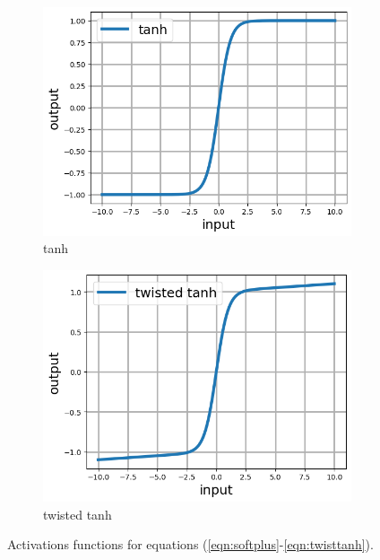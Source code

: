\documentclass[12pt]{article}
\begin{document}
\begin{figure}[h]
\begin{subfigure}[c]{0.45\linewidth}
    \includegraphics[totalheight=4cm]{Figures/scripts/tanh.png}
    \caption{tanh}
  \end{subfigure}
  \begin{subfigure}[c]{0.45\linewidth}
    \includegraphics[totalheight=4cm]{Figures/scripts/twistedtanh.png}
    \caption{twisted tanh}
  \end{subfigure}
\caption{\label{fig:activations} Activations functions for equations (\ref{eqn:softplus}-\ref{eqn:twisttanh}).}
\end{figure}
\end{document}
